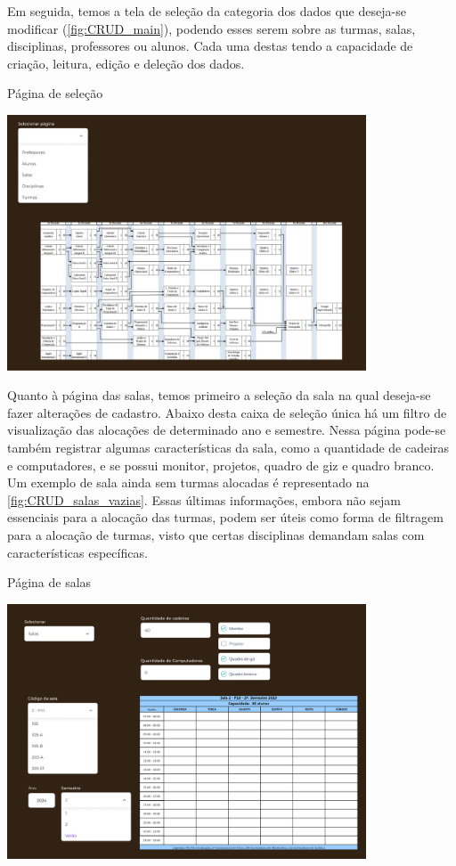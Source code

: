 Em seguida, temos a tela de seleção da categoria dos dados que deseja-se modificar (\autoref{fig:CRUD_main}), podendo esses serem sobre as turmas, salas, disciplinas, professores ou alunos. Cada uma destas tendo a capacidade de criação, leitura, edição e deleção dos dados.

\begin{MyCenteredFigure} \caption{Página de seleção} \label{fig:CRUD_main}
  \includegraphics[width=0.8\textwidth]{files/img/2.02!5-desenvolvimento/2.02!5.1.3-prototipagem/2.02!5.1.3.2-paginas/CRUD_main}
\end{MyCenteredFigure}

Quanto à página das salas, temos primeiro a seleção da sala na qual deseja-se fazer alterações de cadastro. Abaixo desta caixa de seleção única há um filtro de visualização das alocações de determinado ano e semestre. Nessa página pode-se também registrar algumas características da sala, como a quantidade de cadeiras e computadores, e se possui monitor, projetos, quadro de giz e quadro branco. Um exemplo de sala ainda sem turmas alocadas é representado na \autoref{fig:CRUD_salas_vazias}. Essas últimas informações, embora não sejam essenciais para a alocação das turmas, podem ser úteis como forma de filtragem para a alocação de turmas, visto que certas disciplinas demandam salas com características específicas.

\begin{MyCenteredFigure} \caption{Página de salas} \label{fig:CRUD_salas_vazias}
  \includegraphics[width=0.8\textwidth]{files/img/2.02!5-desenvolvimento/2.02!5.1.3-prototipagem/2.02!5.1.3.2-paginas/crud_salas_vazias}
\end{MyCenteredFigure}

